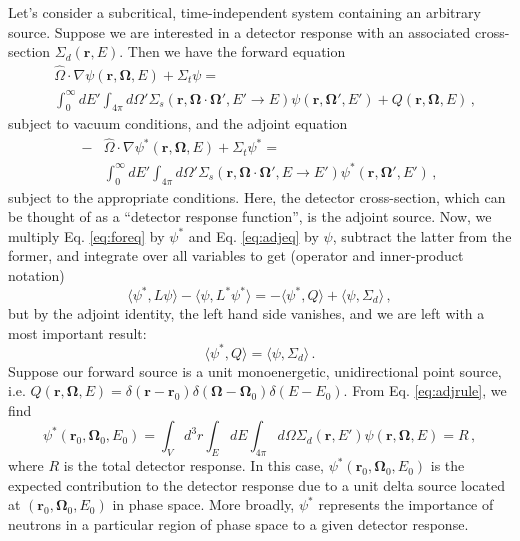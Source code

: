 Let's consider a subcritical, time-independent system containing an arbitrary source.  Suppose we are interested in a detector response with an associated cross-section $\Sigma_d(\mathbf{r},E)$.  Then we have the forward equation
\begin{equation}
  \begin{split}
     &\hat{\Omega} \cdot \nabla \psi(\mathbf{r},\mathbf{\Omega},E) + \Sigma_t \psi = \\
     &\int^{\infty}_{0} dE' \int_{4\pi} d\Omega' \Sigma_s(\mathbf{r},\mathbf{\Omega}\cdot\mathbf{\Omega}',E'\to E)\psi(\mathbf{r},\mathbf{\Omega'},E') + Q(\mathbf{r},\mathbf{\Omega},E)  \, ,
  \end{split}
  \label{eq:foreq}
\end{equation}
subject to vacuum conditions, and the adjoint equation
\begin{equation}
  \begin{split}
     -&\hat{\Omega} \cdot \nabla \psi^*(\mathbf{r},\mathbf{\Omega},E) + \Sigma_t \psi^* = \\
     &\int^{\infty}_{0} dE' \int_{4\pi} d\Omega' \Sigma_s(\mathbf{r},\mathbf{\Omega}\cdot\mathbf{\Omega}',E\to E')\psi^*(\mathbf{r},\mathbf{\Omega'},E')  \, ,
  \end{split}
  \label{eq:adjeq}
\end{equation}
subject to the appropriate conditions.  Here, the detector cross-section, which can be thought of as a ``detector response function'', is the adjoint source.  Now, we multiply Eq. \ref{eq:foreq} by $\psi^*$ and Eq. \ref{eq:adjeq} by $\psi$, subtract the latter from the former, and integrate over all variables to get (operator and inner-product notation)
\begin{equation}
 \langle \psi^*, L \psi \rangle - \langle \psi, L^* \psi^* \rangle = - \langle \psi^*, Q \rangle +  \langle \psi, \Sigma_d \rangle \, ,
\end{equation}
but by the adjoint identity, the left hand side vanishes, and we are left with a most important result:
\begin{equation}
 \langle \psi^*, Q \rangle =  \langle \psi, \Sigma_d \rangle \, .
 \label{eq:adjrule}
\end{equation}
Suppose our forward source is a unit monoenergetic, unidirectional point source, i.e. $Q(\mathbf{r},\mathbf{\Omega},E) = \delta(\mathbf{r}-\mathbf{r}_0)\delta(\mathbf{\Omega}-\mathbf{\Omega}_0)\delta(E-E_0)$.  From Eq. \ref{eq:adjrule}, we find
\begin{equation}
 \psi^*(\mathbf{r}_0,\mathbf{\Omega}_0,E_0) = \int_V d^3r \int_{E} dE \int_{4\pi} d\Omega \Sigma_d(\mathbf{r},E') \psi(\mathbf{r},\mathbf{\Omega},E) = R \, ,
\end{equation}
where $R$ is the total detector response.  In this case, $\psi^*(\mathbf{r}_0,\mathbf{\Omega}_0,E_0)$ is the expected contribution to the detector response due to a unit delta source located at $(\mathbf{r}_0,\mathbf{\Omega}_0,E_0)$ in phase space.  More broadly, $\psi^*$ represents the importance of neutrons in a particular region of phase space to a given detector response.

